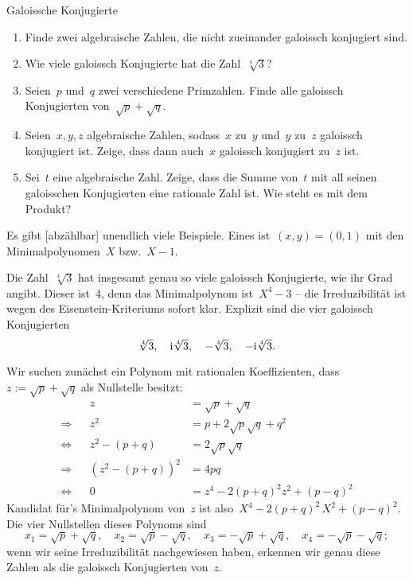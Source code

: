\documentclass{algblatt}
\begin{document}
\begin{aufgabe}{Galoissche Konjugierte}
\begin{enumerate}
\item Finde zwei algebraische Zahlen, die nicht zueinander galoissch konjugiert
sind.
\item Wie viele galoissch Konjugierte hat die Zahl~$\sqrt[4]{3}$?
\item Seien~$p$ und~$q$ zwei verschiedene Primzahlen. Finde alle
galoissch Konjugierten von~$\sqrt{p} + \sqrt{q}$.
\item Seien~$x, y, z$ algebraische Zahlen, sodass~$x$ zu~$y$ und~$y$ zu~$z$
galoissch konjugiert ist. Zeige, dass dann auch~$x$ galoissch konjugiert zu~$z$
ist.
\item Sei~$t$ eine algebraische Zahl. Zeige, dass die Summe von~$t$ mit all
seinen galoisschen Konjugierten eine rationale Zahl ist. Wie steht es mit dem
Produkt?
\end{enumerate}

\begin{loesungE}
\item Es gibt [abzählbar] unendlich viele Beispiele. Eines ist~$(x,y) = (0,1)$
mit den Minimalpolynomen~$X$ bzw.~$X-1$.

\item Die Zahl~$\sqrt[4]{3}$ hat insgesamt genau so viele galoissch Konjugierte, wie
ihr Grad angibt. Dieser ist~$4$, denn das Minimalpolynom ist~$X^4 - 3$ -- die
Irreduzibilität ist wegen des Eisenstein-Kriteriums sofort klar.
Explizit sind die vier galoissch Konjugierten
\[ \sqrt[4]{3},\quad \mathrm{i} \sqrt[4]{3},\quad -\sqrt[4]{3},\quad -\mathrm{i} \sqrt[4]{3}. \]

\item Wir suchen zunächst ein Polynom mit rationalen Koeffizienten, dass~$z :=
\sqrt{p} + \sqrt{q}$ als Nullstelle besitzt:
\begin{align*}
  && z &= \sqrt{p} + \sqrt{q} \\
  \Longrightarrow && z^2 &= p + 2\sqrt{p}\sqrt{q} + q^2 \\
  \Longleftrightarrow && z^2 - (p+q) &= 2\sqrt{p}\sqrt{q} \\
  \Longrightarrow && \left(z^2 - (p+q)\right)^2 &= 4pq \\
  \Longleftrightarrow && 0 &= z^4 - 2(p+q)^2z^2 + (p-q)^2
\end{align*}
Kandidat für's Minimalpolynom von~$z$ ist also~$X^4 - 2(p+q)^2\,X^2 + (p-q)^2$.
Die vier Nullstellen dieses Polynoms sind
\[
  x_1 = \sqrt{p} + \sqrt{q},\quad
  x_2 = \sqrt{p} - \sqrt{q},\quad
  x_3 = -\sqrt{p} + \sqrt{q},\quad
  x_4 = -\sqrt{p} - \sqrt{q};
\]
wenn wir seine Irreduzibilität nachgewiesen haben, erkennen wir genau diese
Zahlen als die galoissch Konjugierten von~$z$.


\end{loesungE}
\end{aufgabe}
\end{document}
